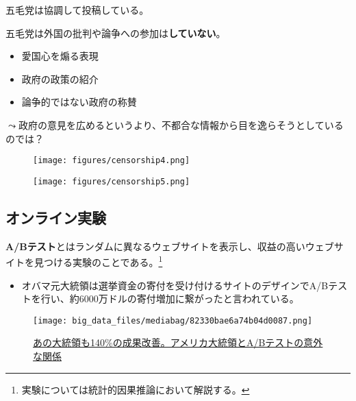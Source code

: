 \documentclass[
  xelatex,
  ja=standard]{bxjsarticle}
\providecommand{\tightlist}{%
  \setlength{\itemsep}{0pt}\setlength{\parskip}{0pt}}\usepackage{longtable,booktabs,array}
\begin{document}
五毛党は協調して投稿している。

五毛党は外国の批判や論争への参加は\textbf{していない}。

\begin{itemize}
\tightlist
\item
  愛国心を煽る表現
\item
  政府の政策の紹介
\item
  論争的ではない政府の称賛
\end{itemize}

\(\leadsto\)政府の意見を広めるというより、不都合な情報から目を逸らそうとしているのでは？

\begin{figure}[htpb]

{\centering \texttt{[image: figures/censorship4.png]}

}

\caption{\citet{king2017}}

\end{figure}

\begin{figure}[htpb]

{\centering \texttt{[image: figures/censorship5.png]}

}

\caption{\citet{king2017}}

\end{figure}

\hypertarget{ux30aaux30f3ux30e9ux30a4ux30f3ux5b9fux9a13}{%
\subsection{オンライン実験}\label{ux30aaux30f3ux30e9ux30a4ux30f3ux5b9fux9a13}}

\textbf{A/Bテスト}とはランダムに異なるウェブサイトを表示し、収益の高いウェブサイトを見つける実験のことである。\footnote{実験については統計的因果推論において解説する。}

\begin{itemize}
\tightlist
\item
  オバマ元大統領は選挙資金の寄付を受け付けるサイトのデザインでA/Bテストを行い、約6000万ドルの寄付増加に繋がったと言われている。
\end{itemize}

\begin{figure}[htpb]

{\centering \texttt{[image: big\_data\_files/mediabag/82330bae6a74b04d0087.png]}

}

\caption{\href{https://juicer.cc/articles/archives/1273/}{あの大統領も140\%の成果改善。アメリカ大統領とA/Bテストの意外な関係}}

\end{figure}
\end{document}
